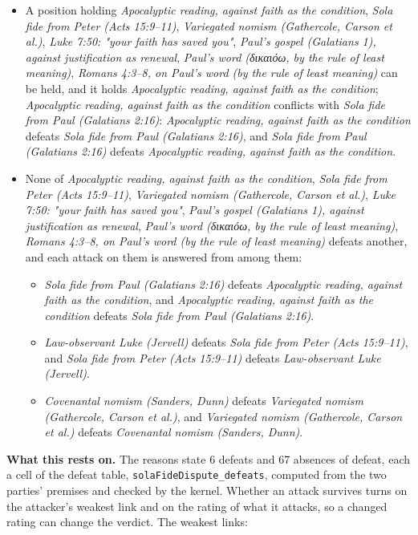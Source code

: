 \documentclass[11pt]{article}
\begin{document}
\begin{itemize}
\item A position holding \emph{Apocalyptic reading, against faith as the condition}, \emph{Sola fide from Peter (Acts 15:9–11)}, \emph{Variegated nomism (Gathercole, Carson et al.)}, \emph{Luke 7:50: "your faith has saved you"}, \emph{Paul's gospel (Galatians 1), against justification as renewal}, \emph{Paul's word (δικαιόω, by the rule of least meaning)}, \emph{Romans 4:3–8, on Paul's word (by the rule of least meaning)} can be held, and it holds \emph{Apocalyptic reading, against faith as the condition}; \emph{Apocalyptic reading, against faith as the condition} conflicts with \emph{Sola fide from Paul (Galatians 2:16)}: \emph{Apocalyptic reading, against faith as the condition} defeats \emph{Sola fide from Paul (Galatians 2:16)}, and \emph{Sola fide from Paul (Galatians 2:16)} defeats \emph{Apocalyptic reading, against faith as the condition}.
\item None of \emph{Apocalyptic reading, against faith as the condition}, \emph{Sola fide from Peter (Acts 15:9–11)}, \emph{Variegated nomism (Gathercole, Carson et al.)}, \emph{Luke 7:50: "your faith has saved you"}, \emph{Paul's gospel (Galatians 1), against justification as renewal}, \emph{Paul's word (δικαιόω, by the rule of least meaning)}, \emph{Romans 4:3–8, on Paul's word (by the rule of least meaning)} defeats another, and each attack on them is answered from among them:
\begin{itemize}
\item \emph{Sola fide from Paul (Galatians 2:16)} defeats \emph{Apocalyptic reading, against faith as the condition}, and \emph{Apocalyptic reading, against faith as the condition} defeats \emph{Sola fide from Paul (Galatians 2:16)}.
\item \emph{Law-observant Luke (Jervell)} defeats \emph{Sola fide from Peter (Acts 15:9–11)}, and \emph{Sola fide from Peter (Acts 15:9–11)} defeats \emph{Law-observant Luke (Jervell)}.
\item \emph{Covenantal nomism (Sanders, Dunn)} defeats \emph{Variegated nomism (Gathercole, Carson et al.)}, and \emph{Variegated nomism (Gathercole, Carson et al.)} defeats \emph{Covenantal nomism (Sanders, Dunn)}.
\end{itemize}
\end{itemize}
\par\noindent\textbf{What this rests on.} The reasons state 6 defeats and 67 absences of defeat, each a cell of the defeat table, \texttt{sola\allowbreak{}Fide\allowbreak{}Dispute\_\allowbreak{}defeats}, computed from the two parties' premises and checked by the kernel. Whether an attack survives turns on the attacker's weakest link and on the rating of what it attacks, so a changed rating can change the verdict. The weakest links:
\end{document}
